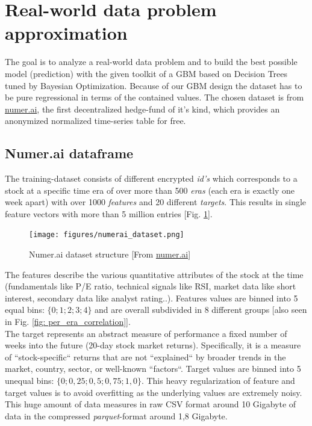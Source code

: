 \documentclass[12pt, a4paper]{article}
\begin{document}
\section{Real-world data problem approximation}
The goal is to analyze a real-world data problem and to build the best possible model (prediction) with the given toolkit of a GBM based on Decision Trees tuned by Bayesian Optimization. Because of our GBM design the dataset has to be pure regressional in terms of the contained values. The chosen dataset is from \href{https://numer.ai}{numer.ai}, the first decentralized hedge-fund of it's kind, which provides an anonymized normalized time-series table for free.
\subsection{Numer.ai dataframe}
The training-dataset consists of different encrypted \textit{id's} which corresponds to a stock at a specific time era of over more than 500 \textit{eras} (each era is exactly one week apart) with over 1000 \textit{features} and 20 different \textit{targets}. This results in single feature vectors with more than 5 million entries  [Fig. \ref{fig: numerai_dataset}]. 
\begin{figure}[!htpb]
    \centering
    \texttt{[image: figures/numerai\_dataset.png]}
    \caption[Numer.ai dataset structure]{Numer.ai dataset structure [From \href{https://numer.ai/}{numer.ai}]}
    \label{fig: numerai_dataset}    
\end{figure}
The features describe the various quantitative attributes of the stock at the time (fundamentals like P/E ratio, technical signals like RSI, market data like short interest, secondary data like analyst rating..).
Features values are binned into 5 equal bins: $\{0;1;2;3;4\}$ and are overall subdivided in 8 different groups [also seen in Fig. \ref{fig: per_era_correlation}].  \\
The target represents an abstract measure of performance a fixed number of weeks into the future (20-day stock market returns). Specifically, it is a measure of ``stock-specific`` returns that are not ``explained`` by broader trends in the market, country, sector, or well-known ``factors``. Target values are binned into 5 unequal bins: $\{0; 0,25; 0,5; 0,75; 1,0\}$. This heavy regularization of feature and target values is to avoid overfitting as the underlying values are extremely noisy. \\
This huge amount of data measures in raw CSV format around 10 Gigabyte of data in the compressed \textit{parquet}-format around 1,8 Gigabyte. 
\end{document}
